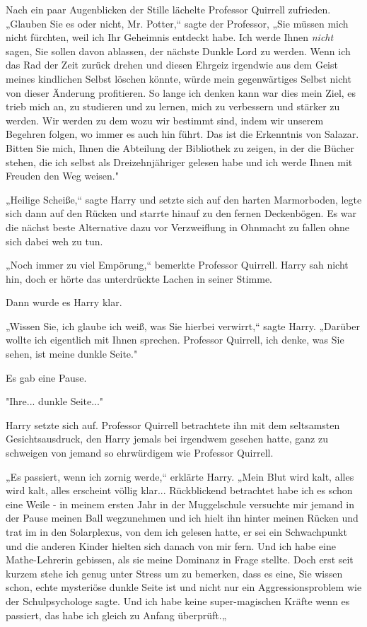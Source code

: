 {Nach ein paar Augenblicken der Stille lächelte Professor Quirrell zufrieden. „Glauben Sie es oder nicht, Mr. Potter,“ sagte der Professor, „Sie müssen mich nicht fürchten, weil ich Ihr Geheimnis entdeckt habe. Ich werde Ihnen \emph{nicht} sagen, Sie sollen davon ablassen, der nächste Dunkle Lord zu werden. Wenn ich das Rad der Zeit zurück drehen und diesen Ehrgeiz irgendwie aus dem Geist meines kindlichen Selbst löschen könnte, würde mein gegenwärtiges Selbst nicht von dieser Änderung profitieren. So lange ich denken kann war dies mein Ziel, es trieb mich an, zu studieren und zu lernen, mich zu verbessern und stärker zu werden. Wir werden zu dem wozu wir bestimmt sind, indem wir unserem Begehren folgen, wo immer es auch hin führt. Das ist die Erkenntnis von Salazar. Bitten Sie mich, Ihnen die Abteilung der Bibliothek zu zeigen, in der die Bücher stehen, die ich selbst als Dreizehnjähriger gelesen habe und ich werde Ihnen mit Freuden den Weg weisen."

„Heilige Scheiße,“ sagte Harry und setzte sich auf den harten Marmorboden, legte sich dann auf den Rücken und starrte hinauf zu den fernen Deckenbögen. Es war die nächst beste Alternative dazu vor Verzweiflung in Ohnmacht zu fallen ohne sich dabei weh zu tun.

„Noch immer zu viel Empörung,“ bemerkte Professor Quirrell. Harry sah nicht hin, doch er hörte das unterdrückte Lachen in seiner Stimme.

Dann wurde es Harry klar.

„Wissen Sie, ich glaube ich weiß, was Sie hierbei verwirrt,“ sagte Harry. „Darüber wollte ich eigentlich mit Ihnen sprechen. Professor Quirrell, ich denke, was Sie sehen, ist meine dunkle Seite."

Es gab eine Pause.

"Ihre... dunkle Seite..."

Harry setzte sich auf. Professor Quirrell betrachtete ihn mit dem seltsamsten Gesichtsausdruck, den Harry jemals bei irgendwem gesehen hatte, ganz zu schweigen von jemand so ehrwürdigem wie Professor Quirrell.

„Es passiert, wenn ich zornig werde,“ erklärte Harry. „Mein Blut wird kalt, alles wird kalt, alles erscheint völlig klar... Rückblickend betrachtet habe ich es schon eine Weile - in meinem ersten Jahr in der Muggelschule versuchte mir jemand in der Pause meinen Ball wegzunehmen und ich hielt ihn hinter meinen Rücken und trat im in den Solarplexus, von dem ich gelesen hatte, er sei ein Schwachpunkt und die anderen Kinder hielten sich danach von mir fern. Und ich habe eine Mathe-Lehrerin gebissen, als sie meine Dominanz in Frage stellte. Doch erst seit kurzem stehe ich genug unter Stress um zu bemerken, dass es eine, Sie wissen schon, echte mysteriöse dunkle Seite ist und nicht nur ein Aggressionsproblem wie der Schulpsychologe sagte. Und ich habe keine super-magischen Kräfte wenn es passiert, das habe ich gleich zu Anfang überprüft.„

}
